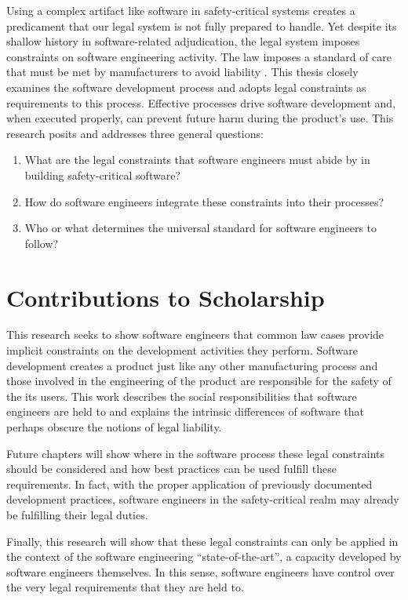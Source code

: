\documentclass[12pt]{report}
\begin{document}
Using a complex artifact like software in safety-critical systems creates a predicament that our legal system is not fully prepared to handle. Yet despite its shallow history in software-related adjudication, the legal system imposes constraints on software engineering activity. The law imposes a standard of care that must be met by manufacturers to avoid liability \cite{FAKE}. This thesis closely examines the software development process and adopts legal constraints as requirements to this process. Effective processes drive software development and, when executed properly, can prevent future harm during the product's use. This research posits and addresses three general questions: \singlespace 
\begin{enumerate} 
\item What are the legal constraints that software engineers must abide by in building safety-critical software? 
\item How do software engineers integrate these constraints into their processes? 
\item Who or what determines the universal standard for software engineers to follow? 
\end{enumerate}\doublespace 

\section{Contributions to Scholarship} 

This research seeks to show software engineers that common law cases provide implicit constraints on the development activities they perform. Software development  creates a product just like any other manufacturing process and those involved in the engineering of the product are responsible for the safety of the its users. This work describes the social responsibilities that software engineers are held to and explains the intrinsic differences of software that perhaps obscure the notions of legal liability.

Future chapters will show where in the software process these legal constraints should be considered and how best practices can be used fulfill these requirements. In fact, with the proper application of previously documented development practices, software engineers in the safety-critical realm may already be fulfilling their legal duties.

Finally, this research will show that these legal constraints can only be applied in the context of the software engineering ``state-of-the-art'', a capacity developed by software engineers themselves. In this sense, software engineers have control over the very legal requirements that they are held to.
\end{document}
